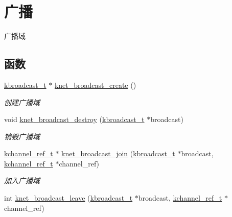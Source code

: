 \hypertarget{a00101}{}\section{广播}
\label{a00101}


广播域  


\subsection*{函数}
\begin{DoxyCompactItemize}
\item 
\hyperlink{a00051_a1b551151864af85fa6cce57058153d04_a1b551151864af85fa6cce57058153d04}{kbroadcast\+\_\+t} $\ast$ \hyperlink{a00101_ga41a1258d2f4ae75120f26ab7f2326111_ga41a1258d2f4ae75120f26ab7f2326111}{knet\+\_\+broadcast\+\_\+create} ()
\begin{DoxyCompactList}\small\item\em 创建广播域 \end{DoxyCompactList}\item 
void \hyperlink{a00101_ga4b13b2545278c2324f4171ef0bbf990a_ga4b13b2545278c2324f4171ef0bbf990a}{knet\+\_\+broadcast\+\_\+destroy} (\hyperlink{a00051_a1b551151864af85fa6cce57058153d04_a1b551151864af85fa6cce57058153d04}{kbroadcast\+\_\+t} $\ast$broadcast)
\begin{DoxyCompactList}\small\item\em 销毁广播域 \end{DoxyCompactList}\item 
\hyperlink{a00051_a3b7e82599367eade261456f60ebe2cd9_a3b7e82599367eade261456f60ebe2cd9}{kchannel\+\_\+ref\+\_\+t} $\ast$ \hyperlink{a00101_ga1355d3863db663680b1c74363d3a5745_ga1355d3863db663680b1c74363d3a5745}{knet\+\_\+broadcast\+\_\+join} (\hyperlink{a00051_a1b551151864af85fa6cce57058153d04_a1b551151864af85fa6cce57058153d04}{kbroadcast\+\_\+t} $\ast$broadcast, \hyperlink{a00051_a3b7e82599367eade261456f60ebe2cd9_a3b7e82599367eade261456f60ebe2cd9}{kchannel\+\_\+ref\+\_\+t} $\ast$channel\+\_\+ref)
\begin{DoxyCompactList}\small\item\em 加入广播域 \end{DoxyCompactList}\item 
int \hyperlink{a00101_ga3bb02208a76f18bb2eee61955b3781cd_ga3bb02208a76f18bb2eee61955b3781cd}{knet\+\_\+broadcast\+\_\+leave} (\hyperlink{a00051_a1b551151864af85fa6cce57058153d04_a1b551151864af85fa6cce57058153d04}{kbroadcast\+\_\+t} $\ast$broadcast, \hyperlink{a00051_a3b7e82599367eade261456f60ebe2cd9_a3b7e82599367eade261456f60ebe2cd9}{kchannel\+\_\+ref\+\_\+t} $\ast$channel\+\_\+ref)

\end{DoxyCompactItemize}
